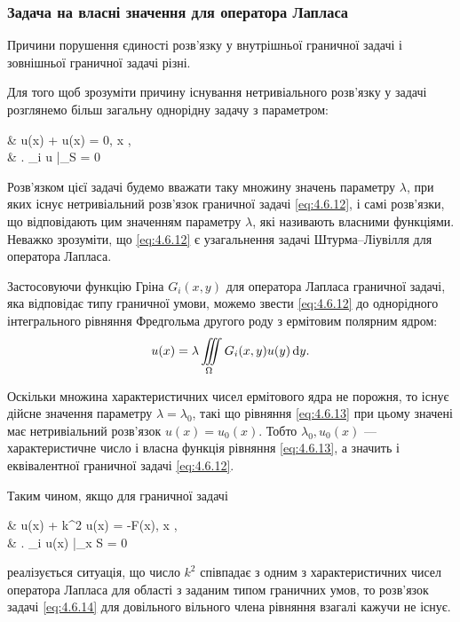 \subsubsection{Задача на власні значення для оператора Лапласа}

Причини порушення єдиності розв'язку у внутрішньої граничної задачі  і зовнішньої граничної задачі  різні. \medskip

Для того щоб зрозуміти причину існування нетривіального розв'язку у задачі  розглянемо більш загальну однорідну задачу з параметром:
\begin{system}
	\label{eq:4.6.12}
	& \Delta u(x) + \lambda u(x) = 0, \quad x \in \Omega, \\
	& \left. \ell_i u \right|_S = 0
\end{system}

Розв'язком цієї задачі будемо вважати таку множину значень параметру $\lambda$, при яких існує нетривіальний розв'язок граничної задачі \eqref{eq:4.6.12}, і самі розв'язки, що відповідають цим значенням параметру $\lambda$, які називають власними функціями. Неважко зрозуміти, що \eqref{eq:4.6.12} є узагальнення задачі Штурма--Ліувілля для оператора Лапласа. \medskip

Застосовуючи функцію Гріна $G_i(x, y)$ для оператора Лапласа граничної задачі, яка відповідає типу граничної умови, можемо звести \eqref{eq:4.6.12} до однорідного інтегрального рівняння Фредгольма другого роду з ермітовим полярним ядром:
\begin{equation}
	\label{eq:4.6.13}
	u(x) = \lambda \displaystyle\iiint\limits_\Omega G_i(x, y) u(y) \mathop{}\!\mathrm{d} y.
\end{equation}

Оскільки множина характеристичних чисел ермітового ядра не порожня, то існує дійсне значення параметру $\lambda = \lambda_0$, такі що рівняння \eqref{eq:4.6.13} при цьому значені має нетривіальний розв'язок $u(x) = u_0(x)$. Тобто $\lambda_0, u_0(x)$ --- характеристичне число і власна функція рівняння \eqref{eq:4.6.13}, а значить і еквівалентної граничної задачі \eqref{eq:4.6.12}. \medskip

Таким чином, якщо для граничної задачі
\begin{system}
	\label{eq:4.6.14}
	& \Delta u(x) + k^2 u(x) = -F(x), \quad x \in \Omega, \\
	& \left. \ell_i u(x) \right|_{x \in S} = 0
\end{system}
реалізується ситуація, що число $ k^2$  співпадає з одним з характеристичних чисел оператора Лапласа для області   з заданим типом граничних умов, то розв'язок задачі \eqref{eq:4.6.14} для довільного вільного члена рівняння взагалі кажучи не існує. \medskip

